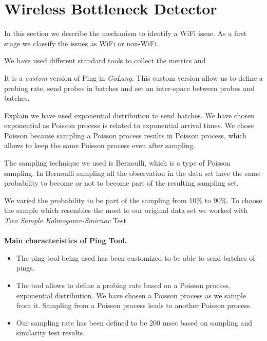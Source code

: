 \section{Wireless Bottleneck Detector}\label{Wireless Bottleneck Detector}

In this section we describe the mechanism to identify a WiFi issue. As a first stage we classify the issues as WiFi or non-WiFi.

We have used different standard tools to collect the metrics and 

It is a \emph{custom} version of Ping in \emph{GoLang}. This custom version allow us to define a probing rate, send probes in batches and set an inter-space between probes and batches.

Explain we have used exponential distribution to send batches. We have chosen exponential as Poisson process is related to exponential arrival times. We chose Poisson because sampling a Poisson process results in Poisson process, which allows to keep the same Poisson process even after sampling.

The sampling technique we used is Bernoulli, which is a type of Poisson sampling. In Bernoulli sampling all the observation in the data set have the same probability to become or not to become part of the resulting sampling set.

We varied the probability to be part of the sampling from 10\% to 90\%. To choose the sample which resembles the most to our original data set we worked with \emph{Two Sample Kolmogorov-Smirnov} Test
\\
\\
\textbf{Main characteristics of Ping Tool.}
\begin{itemize}
	\item The ping tool being used has been customized to be able to send batches of pings.
	\item The tool allows to define a probing rate based on a Poisson process, exponential distribution. We have chosen a Poisson process as we sample from it. Sampling from a Poisson process leads to another Poisson process.
	\item Our sampling rate has been defined to be 200 msec based on sampling and similarity test results.
\end{itemize}


